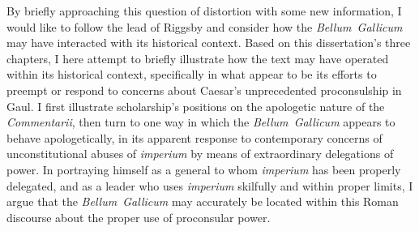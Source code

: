 \documentclass[12pt,letterpaper,oneside,final]{memoir}
\begin{document}
 By briefly approaching this question of distortion with some new information, I would like to follow the lead of Riggsby and consider how the \emph{Bellum~Gallicum} may have interacted with its historical context. Based on this dissertation's three chapters, I here attempt to briefly illustrate how the text may have operated within its historical context, specifically in what appear to be its efforts to preempt or respond to concerns about Caesar's unprecedented proconsulship in Gaul. I first illustrate scholarship's positions on the apologetic nature of the \emph{Commentarii}, then turn to one way in which the \emph{Bellum~Gallicum} appears to behave apologetically, in its apparent response to contemporary concerns of unconstitutional abuses of \emph{imperium} by means of extraordinary delegations of power. In portraying himself as a general to whom \emph{imperium} has been properly delegated, and as a leader who uses \emph{imperium} skilfully and within proper limits, I argue that the \emph{Bellum~Gallicum} may accurately be located within this Roman discourse about the proper use of proconsular power.
\end{document}
